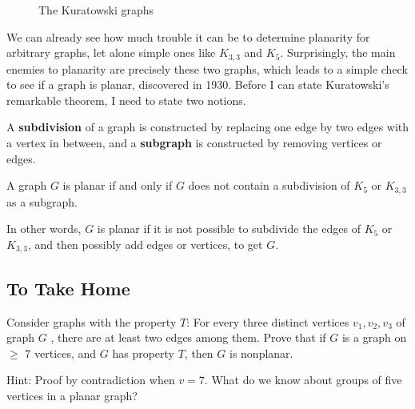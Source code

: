 \documentclass[11 pt]{scrartcl}
\newcommand{\drawLinewithBG}[2]
{
  \draw[white,myBG]  (#1) -- (#2);
  \draw[black,very thick] (#1) -- (#2);
}
\newcommand{\drawPolarLinewithBG}[2]
{
  \draw[white,myBG]  (#1) -- (#2);
  \draw[black,very thick] (#1) -- (#2);
}
\begin{document}
\begin{figure}[!htb]
    \centering
\caption{The Kuratowski graphs}
\end{figure}

We can already see how much trouble it can be to determine planarity for arbitrary graphs, let alone simple ones like $K_{3,3}$ and $K_5$. Surprisingly, the main enemies to planarity are precisely these two graphs, which leads to a simple check to see if a graph is planar, discovered in 1930. Before I can state Kuratowski's remarkable theorem, I need to state two notions.

A \textbf{subdivision} of a graph is constructed by replacing one edge by two edges with a vertex in between, and a \textbf{subgraph} is constructed by removing vertices or edges.

\begin{theorem}[Kuratowski]
    A graph $G$ is planar if and only if $G$ does not contain a subdivision of $K_5$ or $K_{3,3}$ as a subgraph.
\end{theorem}

In other words, $G$ is planar if it is not possible to subdivide the edges of $K_5$ or $K_{3,3}$, and then possibly add edges or vertices, to get $G$.

\subsection{To Take Home}
\begin{exercise}
    Consider graphs with the property $T$: For every three distinct vertices $v_1,v_2,v_3$ of graph $G$ , there are at least two edges among them. 
    Prove that if $G$ is a graph on $\geq$ 7 vertices, and $G$ has property $T$, then $G$ is nonplanar. 
\end{exercise}
Hint: Proof by contradiction when $v = 7$. What do we know about groups of five vertices in a planar graph?
\end{document}
